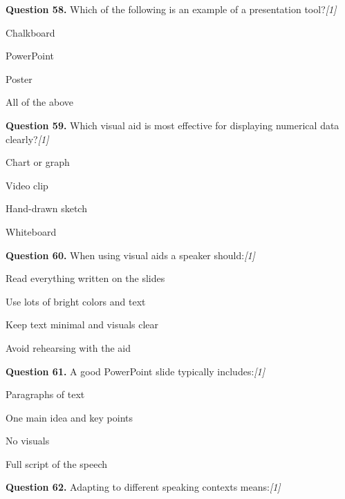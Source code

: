 \documentclass[11pt,a4paper]{article}
\newcommand{\pts}[1]{\hfill   \textit{[#1]}}
\begin{document}
\medskip


\noindent   \textbf{Question 58.} Which of the following is an example of a presentation tool?\pts{1}

\begin{parts}
  \item Chalkboard
  \item PowerPoint
  \item Poster
  \item All of the above
\end{parts}

\medskip


\noindent   \textbf{Question 59.} Which visual aid is most effective for displaying numerical data clearly?\pts{1}

\begin{parts}
  \item Chart or graph
  \item Video clip
  \item Hand-drawn sketch
  \item Whiteboard
\end{parts}

\medskip


\noindent   \textbf{Question 60.} When using visual aids a speaker should:\pts{1}

\begin{parts}
  \item Read everything written on the slides
  \item Use lots of bright colors and text
  \item Keep text minimal and visuals clear
  \item Avoid rehearsing with the aid
\end{parts}

\medskip


\noindent   \textbf{Question 61.} A good PowerPoint slide typically includes:\pts{1}

\begin{parts}
  \item Paragraphs of text
  \item One main idea and key points
  \item No visuals
  \item Full script of the speech
\end{parts}

\medskip


\noindent   \textbf{Question 62.} Adapting to different speaking contexts means:\pts{1}
\end{document}
